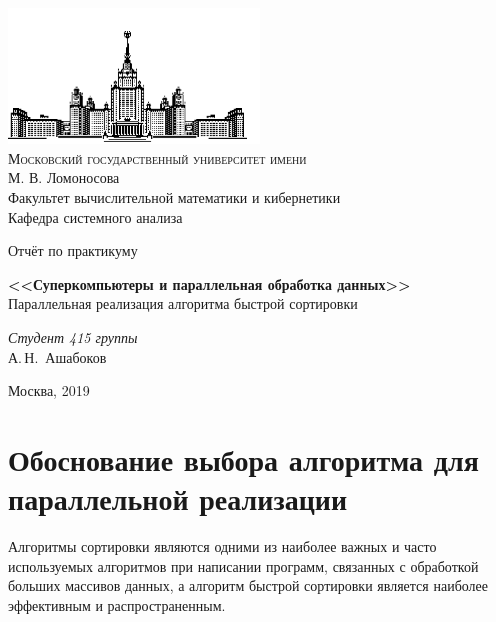 \documentclass[a4paper, 12pt]{article}
\begin{document}
\thispagestyle{empty}

\begin{center}
\vspace{-3cm}
\includegraphics[width=0.5\textwidth]{msu.png}\\
{\scshape Московский государственный университет имени}\\
М. В. Ломоносова\\
Факультет вычислительной математики и кибернетики\\
Кафедра системного анализа

\vfill

{\LARGE Отчёт по практикуму}

\vspace{1cm}

{\Huge\bfseries <<Суперкомпьютеры и параллельная обработка данных>>}\\
{\LARGE Параллельная реализация алгоритма быстрой сортировки}
\end{center}

\vspace{1cm}

\begin{flushright}
  \large
  \textit{Студент 415 группы}\\
  А.\,Н.~Ашабоков

  \vspace{5mm}


\end{flushright}

\vfill

\begin{center}
Москва, 2019
\end{center}

\newpage
\setcounter{tocdepth}{1}
\tableofcontents

\newpage
\normalsize

\section{Обоснование выбора алгоритма для параллельной реализации}
Алгоритмы сортировки являются одними из наиболее важных и часто используемых алгоритмов при написании программ, связанных с обработкой больших массивов данных, а алгоритм быстрой сортировки является наиболее эффективным и распространенным.
\end{document}

